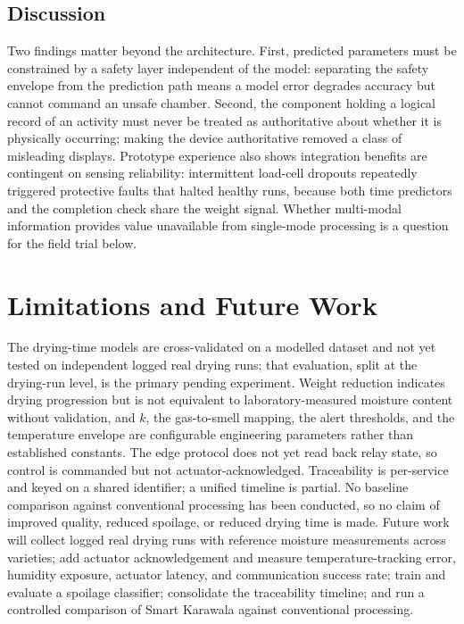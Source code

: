 \documentclass[conference]{IEEEtran}
\begin{document}
\subsection{Discussion}
Two findings matter beyond the architecture. First, predicted parameters
must be constrained by a safety layer independent of the model: separating
the safety envelope from the prediction path means a model error degrades
accuracy but cannot command an unsafe chamber. Second, the component
holding a logical record of an activity must never be treated as
authoritative about whether it is physically occurring; making the device
authoritative removed a class of misleading displays. Prototype experience
also shows integration benefits are contingent on sensing reliability:
intermittent load-cell dropouts repeatedly triggered protective faults
that halted healthy runs, because both time predictors and the completion
check share the weight signal. Whether multi-modal information provides
value unavailable from single-mode processing is a question for the field
trial below.

\section{Limitations and Future Work}
The drying-time models are cross-validated on a modelled dataset and not
yet tested on independent logged real drying runs; that evaluation, split
at the drying-run level, is the primary pending experiment. Weight
reduction indicates drying progression but is not equivalent to
laboratory-measured moisture content without validation, and $k$, the
gas-to-smell mapping, the alert thresholds, and the temperature envelope
are configurable engineering parameters rather than established constants.
The edge protocol does not yet read back relay state, so control is
commanded but not actuator-acknowledged. Traceability is per-service and
keyed on a shared identifier; a unified timeline is partial. No baseline
comparison against conventional processing has been conducted, so no claim
of improved quality, reduced spoilage, or reduced drying time is made.
Future work will collect logged real drying runs with reference moisture
measurements across varieties; add actuator acknowledgement and measure
temperature-tracking error, humidity exposure, actuator latency, and
communication success rate; train and evaluate a spoilage classifier;
consolidate the traceability timeline; and run a controlled comparison of
Smart Karawala against conventional processing.
\end{document}
